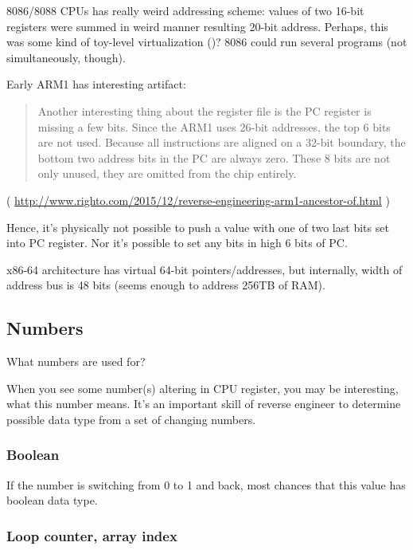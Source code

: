 8086/8088 CPUs has really weird addressing scheme:
values of two 16-bit registers were summed in weird manner resulting 20-bit address.
Perhaps, this was some kind of toy-level virtualization ()?
8086 could run several programs (not simultaneously, though).

Early ARM1 has interesting artifact:

\begin{framed}
\begin{quotation}
Another interesting thing about the register file is the PC register is missing a few bits. Since the ARM1 uses 26-bit addresses, the top 6 bits are not used. Because all instructions are aligned on a 32-bit boundary, the bottom two address bits in the PC are always zero. These 8 bits are not only unused, they are omitted from the chip entirely.
\end{quotation}
\end{framed}

( \url{http://www.righto.com/2015/12/reverse-engineering-arm1-ancestor-of.html} )

Hence, it's physically not possible to push a value with one of two last bits set into PC register.
Nor it's possible to set any bits in high 6 bits of PC.

x86-64 architecture has virtual 64-bit pointers/addresses, but internally, width of address bus is 48 bits
(seems enough to address 256TB of \ac{RAM}).

\subsection{Numbers}

What numbers are used for?

When you see some number(s) altering in CPU register, you may be interesting, what this number means.
It's an important skill of reverse engineer to determine possible data type from a set of changing numbers.

\subsubsection{Boolean}

If the number is switching from 0 to 1 and back, most chances that this value has boolean data type.

\subsubsection{Loop counter, array index}

